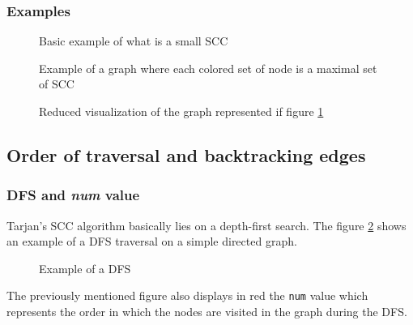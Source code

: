 \documentclass[a4 paper, 12pt]{article}
\begin{document}
\subsubsection{Examples}
\begin{figure}[!h]
    \centering
    \begin{subfigure}[t]{.49\textwidth}
    \end{subfigure}
    \begin{subfigure}[t]{.49\textwidth}
    \end{subfigure}
    \caption{Basic example of what is a small SCC}
\end{figure}
\begin{figure}[!h]
    \caption{Example of a graph where each colored set of node is a maximal set of SCC\label{fig:exampleSCC}}
\end{figure}

\begin{figure}[!h]
    \caption{Reduced visualization of the graph represented if figure \ref{fig:exampleSCC}}
\end{figure}

\subsection{Order of traversal and backtracking edges}
\subsubsection{DFS and \textit{num} value}
Tarjan's SCC algorithm basically lies on a depth-first search. The figure \ref{fig:dfs} shows an example of a DFS traversal on a simple directed graph.
\begin{figure}[!h]
    \caption{Example of a DFS\label{fig:dfs}}
\end{figure}

The previously mentioned figure also displays in red the \texttt{num} value which represents the order in which the nodes are visited in the graph during the DFS.
\end{document}
